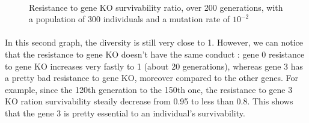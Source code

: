 \documentclass[]{report} %
\begin{document}
    \paragraph*{}
    \begin{figure}[H] 
      \centering
      \caption{Resistance to gene KO survivability ratio, over 200 generations, with a population of 300 individuals and a mutation rate of $10^{-2}$}
      \label{fig:ps200xg300xmr1-10-2}
    \end{figure}
    \paragraph*{}
    In this second graph, the diversity is still very close to 1. However, we can notice that the resistance to gene KO doesn't have the same conduct : 
    gene 0 resistance to gene KO increases very fastly to 1 (about 20 generations), whereas gene 3 has a pretty bad resistance to gene KO, 
    moreover compared to the other genes. For example, since the 120th generation to the  150th one, the resistance to gene 3 KO ration 
    survivability steaily decrease from 0.95 to less than 0.8. This shows that the gene 3 is pretty essential to an individual's survivability.
 
\end{document}
